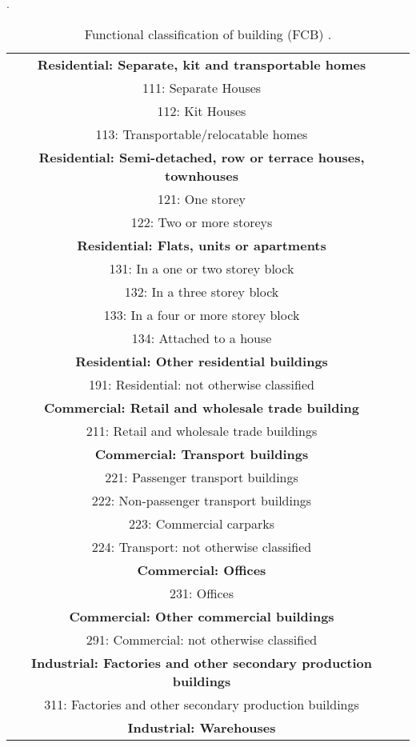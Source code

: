\begin{table}
\centering \caption{Functional classification of building
(FCB) \citep{dr_ABS01a}
  .} \vspace{0.8em} \label{tab:grids-FCB} 
   {\footnotesize .
\begin{tabular}{|c|p{}|}
 \hline
\textbf{Residential: Separate, kit and transportable homes} \\
 111: Separate Houses\\
 112: Kit Houses\\
 113: Transportable/relocatable homes\\
\textbf{Residential: Semi-detached, row or terrace houses, townhouses}  \\
 121: One storey\\
 122: Two or more storeys\\
 \textbf{Residential: Flats, units or apartments} \\
 131:  In a one or two storey block\\
 132: In a three storey block\\
 133:  In a four or more storey block\\
 134:  Attached to a house\\
 \textbf{Residential: Other residential buildings} \\
 191:  Residential: not otherwise classified \\
\hline
 \textbf{Commercial: Retail and wholesale trade building} \\
 211:  Retail and wholesale trade buildings \\
 \textbf{Commercial: Transport buildings} \\
 221:  Passenger transport buildings\\
 222:  Non-passenger transport buildings\\
 223:  Commercial carparks\\
 224:  Transport: not otherwise classified\\
 \textbf{Commercial: Offices} \\
 231:  Offices \\
 \textbf{Commercial: Other commercial buildings} \\
 291:  Commercial: not otherwise classified\\
 \textbf{Industrial: Factories and other secondary production buildings} \\
 311:  Factories and other secondary production buildings \\
 \textbf{Industrial: Warehouses} \\

\end{tabular}}
\end{table}
